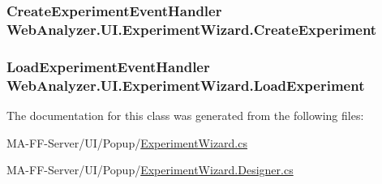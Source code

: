 \subsubsection[{Create\+Experiment}]{\setlength{\rightskip}{0pt plus 5cm}Create\+Experiment\+Event\+Handler Web\+Analyzer.\+U\+I.\+Experiment\+Wizard.\+Create\+Experiment}\label{class_web_analyzer_1_1_u_i_1_1_experiment_wizard_ac18185c9d12c074d2b82c2426e545461}
\hypertarget{class_web_analyzer_1_1_u_i_1_1_experiment_wizard_ad469bc433ee12cf551309f1b2ab37e65}{}
\subsubsection[{Load\+Experiment}]{\setlength{\rightskip}{0pt plus 5cm}Load\+Experiment\+Event\+Handler Web\+Analyzer.\+U\+I.\+Experiment\+Wizard.\+Load\+Experiment}\label{class_web_analyzer_1_1_u_i_1_1_experiment_wizard_ad469bc433ee12cf551309f1b2ab37e65}


The documentation for this class was generated from the following files\+:\begin{DoxyCompactItemize}
\item 
M\+A-\/\+F\+F-\/\+Server/\+U\+I/\+Popup/\hyperlink{_experiment_wizard_8cs}{Experiment\+Wizard.\+cs}\item 
M\+A-\/\+F\+F-\/\+Server/\+U\+I/\+Popup/\hyperlink{_experiment_wizard_8_designer_8cs}{Experiment\+Wizard.\+Designer.\+cs}\end{DoxyCompactItemize}
